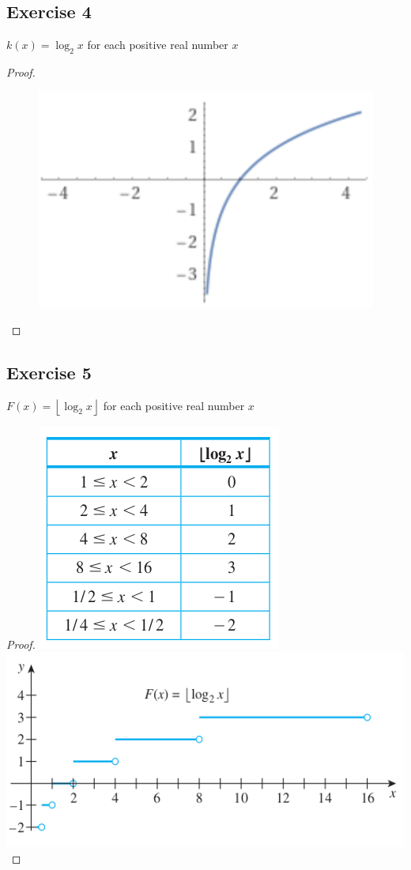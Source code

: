 \documentclass[14pt]{extarticle}
\newcommand{\floor}[1]{{\left\lfloor#1\right\rfloor}}
\begin{document}
\subsection{Exercise 4}
\(k(x) = \log_2 x\) for each positive real number \(x\)

\begin{proof}
    \begin{figure}[ht!]
        \centering
        \includegraphics[scale=0.5]{../images/11.4.4.png}
    \end{figure}
\end{proof}

\subsection{Exercise 5}
\(F(x) = \floor{\log_2 x}\) for each positive real number \(x\)

\begin{proof}
    \includegraphics[scale=0.5]{../images/11.4.5.1.png}
    \includegraphics[scale=0.5]{../images/11.4.5.2.png}
\end{proof}
\end{document}

